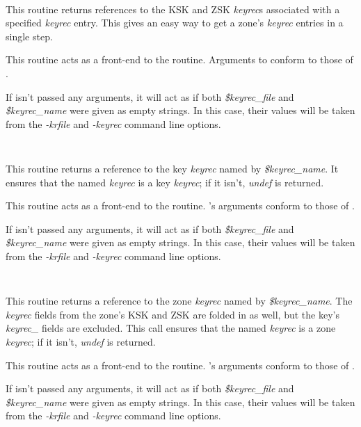 \begin{description}
\item {}\verb" "

This routine returns references to the KSK and ZSK {\it keyrec}s associated
with a specified {\it keyrec} entry.  This gives an easy way to get a zone's
{\it keyrec} entries in a single step.

This routine acts as a front-end to the  routine.
Arguments to  conform to those of .

If  isn't passed any arguments, it will act as if both
{\it \$keyrec\_file} and {\it \$keyrec\_name} were given as empty strings.  In
this case, their values will be taken from the {\it -krfile} and {\it -keyrec}
command line options.

\item {}\verb" "

This routine returns a reference to the key {\it keyrec} named by {\it
\$keyrec\_name}.  It ensures that the named {\it keyrec} is a key {\it keyrec};
if it isn't, {\it undef} is returned.

This routine acts as a front-end to the  routine.
's arguments conform to those of .

If  isn't passed any arguments, it will act as if both {\it
\$keyrec\_file} and {\it \$keyrec\_name} were given as empty strings.  In this
case, their values will be taken from the {\it -krfile} and {\it -keyrec}
command line options.

\item {}\verb" "

This routine returns a reference to the zone {\it keyrec} named by
{\it \$keyrec\_name}.  The {\it keyrec} fields from the zone's KSK and ZSK are
folded in as well, but the key's {\it keyrec\_} fields are excluded.  This
call ensures that the named {\it keyrec} is a zone {\it keyrec}; if it isn't,
{\it undef} is returned.

This routine acts as a front-end to the  routine.
's arguments conform to those of .

If  isn't passed any arguments, it will act as if both
{\it \$keyrec\_file} and {\it \$keyrec\_name} were given as empty strings.  In
this case, their values will be taken from the {\it -krfile} and {\it -keyrec}
command line options.


\end{description}
